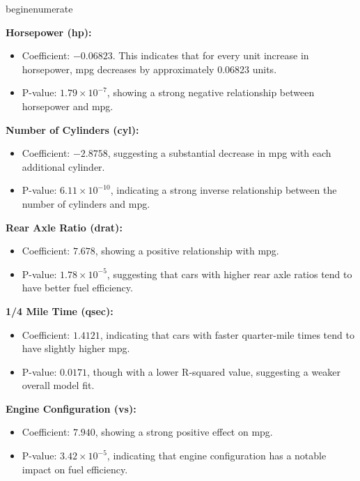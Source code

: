 \documentclass[11pt]{article}\usepackage[]{graphicx}\usepackage[]{xcolor}
\begin{document}
begin{enumerate}
    \item \textbf{Horsepower (hp):}
    \begin{itemize}
        \item Coefficient: $-0.06823$. This indicates that for every unit increase in horsepower, mpg decreases by approximately 0.06823 units.
        \item P-value: $1.79 \times 10^{-7}$, showing a strong negative relationship between horsepower and mpg.
    \end{itemize}

    \item \textbf{Number of Cylinders (cyl):}
    \begin{itemize}
        \item Coefficient: $-2.8758$, suggesting a substantial decrease in mpg with each additional cylinder.
        \item P-value: $6.11 \times 10^{-10}$, indicating a strong inverse relationship between the number of cylinders and mpg.
    \end{itemize}

    \item \textbf{Rear Axle Ratio (drat):}
    \begin{itemize}
        \item Coefficient: $7.678$, showing a positive relationship with mpg.
        \item P-value: $1.78 \times 10^{-5}$, suggesting that cars with higher rear axle ratios tend to have better fuel efficiency.
    \end{itemize}

    \item \textbf{1/4 Mile Time (qsec):}
    \begin{itemize}
        \item Coefficient: $1.4121$, indicating that cars with faster quarter-mile times tend to have slightly higher mpg.
        \item P-value: $0.0171$, though with a lower R-squared value, suggesting a weaker overall model fit.
    \end{itemize}

    \item \textbf{Engine Configuration (vs):}
    \begin{itemize}
        \item Coefficient: $7.940$, showing a strong positive effect on mpg.
        \item P-value: $3.42 \times 10^{-5}$, indicating that engine configuration has a notable impact on fuel efficiency.
    \end{itemize}
\end{document}

